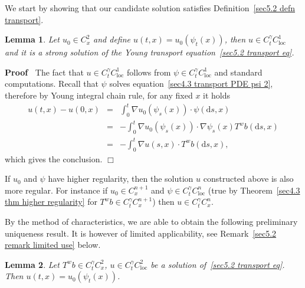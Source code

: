 \documentclass[10pt]{article}
\newcommand{\mathd}{\mathrm{d}}
\newcommand{\tmop}[1]{\ensuremath{\operatorname{#1}}}
\newenvironment{proof}{\noindent\textbf{Proof\ }}{\hspace*{\fill}$\Box$\medskip}
\newtheorem{lemma}{Lemma}
\begin{document}
We start by showing that our candidate solution satisfies
Definition~\ref{sec5.2 defn transport}.

\begin{lemma}
  \label{sec5.2 lemma existence transport}Let $u_0 \in C^2_x$ and define $u
  (t, x) = u_0 (\psi_t (x))$, then $u \in C^{\gamma}_t C^1_{\tmop{loc}}$ and
  it is a strong solution of the Young transport equation~{\eqref{sec5.2
  transport eq}}.
\end{lemma}

\begin{proof}
  The fact that $u \in C^{\gamma}_t C^1_{\tmop{loc}}$ follows from $\psi \in
  C^{\gamma}_t C^1_{\tmop{loc}}$ and standard computations. Recall that $\psi$
  solves equation~{\eqref{sec4.3 transport PDE psi 2}}, therefore by Young
  integral chain rule, for any fixed $x$ it holds
  \begin{eqnarray*}
    u (t, x) - u (0, x) & = & \int_0^t \nabla u_0 (\psi_s (x)) \cdot \psi
    (\mathd s, x)\\
    & = & - \int_0^t \nabla u_0 (\psi_s (x)) \cdot \nabla \psi_s (x) T^w b
    (\mathd s, x)\\
    & = & - \int_0^t \nabla u (s, x) \cdot T^w b (\mathd s, x),
  \end{eqnarray*}
  which gives the conclusion.
\end{proof}

\begin{remark}
  \label{sec5.2 remark higher regularity}If $u_0$ and $\psi$ have higher
  regularity, then the solution $u$ constructed above is also more regular.
  For instance if $u_0 \in C^{n + 1}_x$ and $\psi \in C^{\gamma}_t
  C^n_{\tmop{loc}}$ (true by Theorem~\ref{sec4.3 thm higher regularity} for
  $T^w b \in C^{\gamma}_t C^{n + 1}_x$) then $u \in C^{\gamma}_t C^n_x$.
\end{remark}

By the method of characteristics, we are able to obtain the following
preliminary uniqueness result. It is however of limited applicability, see
Remark~\ref{sec5.2 remark limited use} below.

\begin{lemma}
  \label{sec5.2 baby lemma uniqueness}Let $T^w b \in C^{\gamma}_t C^2_x$, $u
  \in C^{\gamma}_t C^2_{\tmop{loc}}$ be a solution of~{\eqref{sec5.2 transport
  eq}}. Then $u (t, x) = u_0 (\psi_t (x))$.
\end{lemma}
\end{document}
